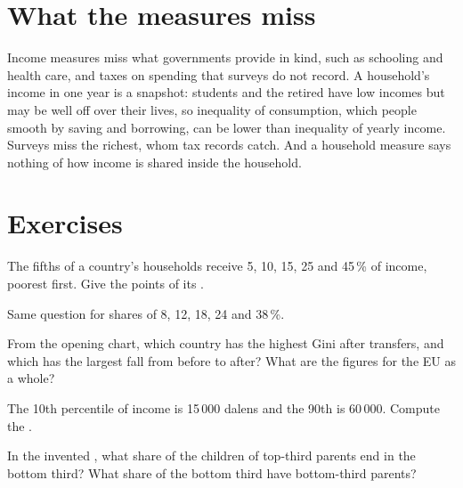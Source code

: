 \section{What the measures miss}\label{sec:g11:inequality:limits}

Income measures miss what governments provide in kind, such as schooling and health care, and taxes on spending that surveys do not record. A household's income in one
year is a snapshot: students and the retired have low incomes but may be well off over their lives, so inequality of consumption, which people smooth by saving and
borrowing, can be lower than inequality of yearly income. Surveys miss the richest, whom tax records catch. And a household measure says nothing of how income is shared
inside the household.

\section{Exercises}

\begin{exercise}[$\star$]\label{exo:g11:inequality:1}
The fifths of a country's households receive 5, 10, 15, 25 and 45\,\% of income, poorest first. Give the points of its .
\end{exercise}

\begin{exercise}[$\star$]\label{exo:g11:inequality:2}
Same question for shares of 8, 12, 18, 24 and 38\,\%.
\end{exercise}

\begin{exercise}[$\star$]\label{exo:g11:inequality:3}
From the opening chart, which country has the highest Gini after transfers, and which has the largest fall from before to after? What are the figures for the EU as a
whole?
\end{exercise}

\begin{exercise}[$\star$]\label{exo:g11:inequality:4}
The 10th percentile of income is 15\,000 dalens and the 90th is 60\,000. Compute the .
\end{exercise}

\begin{exercise}[$\star$]\label{exo:g11:inequality:5}
In the invented , what share of the children of top-third parents end in the bottom third? What share of the bottom third have bottom-third parents?
\end{exercise}

